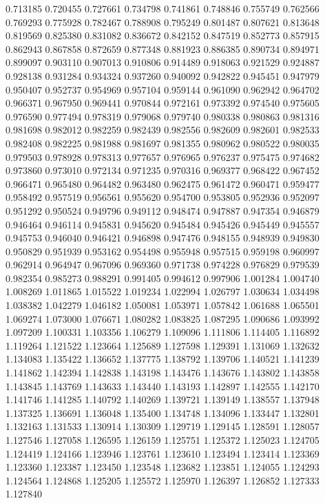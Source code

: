 0.713185
0.720455
0.727661
0.734798
0.741861
0.748846
0.755749
0.762566
0.769293
0.775928
0.782467
0.788908
0.795249
0.801487
0.807621
0.813648
0.819569
0.825380
0.831082
0.836672
0.842152
0.847519
0.852773
0.857915
0.862943
0.867858
0.872659
0.877348
0.881923
0.886385
0.890734
0.894971
0.899097
0.903110
0.907013
0.910806
0.914489
0.918063
0.921529
0.924887
0.928138
0.931284
0.934324
0.937260
0.940092
0.942822
0.945451
0.947979
0.950407
0.952737
0.954969
0.957104
0.959144
0.961090
0.962942
0.964702
0.966371
0.967950
0.969441
0.970844
0.972161
0.973392
0.974540
0.975605
0.976590
0.977494
0.978319
0.979068
0.979740
0.980338
0.980863
0.981316
0.981698
0.982012
0.982259
0.982439
0.982556
0.982609
0.982601
0.982533
0.982408
0.982225
0.981988
0.981697
0.981355
0.980962
0.980522
0.980035
0.979503
0.978928
0.978313
0.977657
0.976965
0.976237
0.975475
0.974682
0.973860
0.973010
0.972134
0.971235
0.970316
0.969377
0.968422
0.967452
0.966471
0.965480
0.964482
0.963480
0.962475
0.961472
0.960471
0.959477
0.958492
0.957519
0.956561
0.955620
0.954700
0.953805
0.952936
0.952097
0.951292
0.950524
0.949796
0.949112
0.948474
0.947887
0.947354
0.946879
0.946464
0.946114
0.945831
0.945620
0.945484
0.945426
0.945449
0.945557
0.945753
0.946040
0.946421
0.946898
0.947476
0.948155
0.948939
0.949830
0.950829
0.951939
0.953162
0.954498
0.955948
0.957515
0.959198
0.960997
0.962914
0.964947
0.967096
0.969360
0.971738
0.974228
0.976829
0.979539
0.982354
0.985273
0.988291
0.991405
0.994612
0.997906
1.001284
1.004740
1.008269
1.011865
1.015522
1.019234
1.022994
1.026797
1.030634
1.034498
1.038382
1.042279
1.046182
1.050081
1.053971
1.057842
1.061688
1.065501
1.069274
1.073000
1.076671
1.080282
1.083825
1.087295
1.090686
1.093992
1.097209
1.100331
1.103356
1.106279
1.109096
1.111806
1.114405
1.116892
1.119264
1.121522
1.123664
1.125689
1.127598
1.129391
1.131069
1.132632
1.134083
1.135422
1.136652
1.137775
1.138792
1.139706
1.140521
1.141239
1.141862
1.142394
1.142838
1.143198
1.143476
1.143676
1.143802
1.143858
1.143845
1.143769
1.143633
1.143440
1.143193
1.142897
1.142555
1.142170
1.141746
1.141285
1.140792
1.140269
1.139721
1.139149
1.138557
1.137948
1.137325
1.136691
1.136048
1.135400
1.134748
1.134096
1.133447
1.132801
1.132163
1.131533
1.130914
1.130309
1.129719
1.129145
1.128591
1.128057
1.127546
1.127058
1.126595
1.126159
1.125751
1.125372
1.125023
1.124705
1.124419
1.124166
1.123946
1.123761
1.123610
1.123494
1.123414
1.123369
1.123360
1.123387
1.123450
1.123548
1.123682
1.123851
1.124055
1.124293
1.124564
1.124868
1.125205
1.125572
1.125970
1.126397
1.126852
1.127333
1.127840
